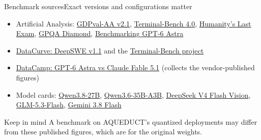 \documentclass[aspectratio=169]{beamer}
\begin{document}
\begin{frame}{Benchmark sources}{Exact versions and configurations matter}
\footnotesize
\begin{itemize}\itemsep4pt
  \item Artificial Analysis: \href{https://artificialanalysis.ai/evaluations/gdpval-aa}{GDPval-AA v2.1}, \href{https://artificialanalysis.ai/evaluations/terminalbench-4-0}{Terminal-Bench 4.0}, \href{https://artificialanalysis.ai/evaluations/humanitys-last-exam}{Humanity's Last Exam}, \href{https://artificialanalysis.ai/evaluations/gpqa-diamond}{GPQA Diamond}, \href{https://artificialanalysis.ai/articles/benchmarking-gpt-6-astra}{Benchmarking GPT-6 Astra}
  \item \href{https://deepswe.datacurve.ai/}{DataCurve: DeepSWE v1.1} and the \href{https://www.tbench.ai/}{Terminal-Bench project}
  \item \href{https://www.datacamp.com/blog/gpt-6-astra-vs-claude-fable-5-1}{DataCamp: GPT-6 Astra vs Claude Fable 5.1} (collects the vendor-published figures)
  \item Model cards: \href{https://huggingface.co/Qwen/Qwen3.8-27B}{Qwen3.8-27B}, \href{https://huggingface.co/Qwen/Qwen3.6-35B-A3B}{Qwen3.6-35B-A3B}, \href{https://huggingface.co/deepseek-ai/DeepSeek-V4-Flash-Vision-Exp}{DeepSeek V4 Flash Vision}, \href{https://huggingface.co/zai-org/GLM-5.3-Flash}{GLM-5.3-Flash}, \href{https://deepmind.google/models/model-cards/gemini-3-8-flash/}{Gemini 3.8 Flash}
\end{itemize}
\vspace{2mm}
\begin{block}{Keep in mind}
A benchmark on AQUEDUCT's quantized deployments may differ from these published figures, which are for the original weights.
\end{block}
\end{frame}
\end{document}
